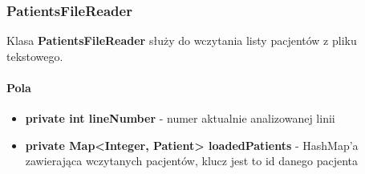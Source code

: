 \documentclass[]{article}
\begin{document}
            \subsubsection{PatientsFileReader}
                Klasa \textbf{PatientsFileReader} służy do wczytania listy pacjentów z pliku tekstowego.
                
                \paragraph{Pola}
                    \begin{itemize}
                        \item \textbf{private int lineNumber} - numer aktualnie analizowanej linii
                        \item \textbf{private Map<Integer, Patient> loadedPatients} - HashMap'a zawierająca wczytanych pacjentów, klucz jest to id danego pacjenta
                    \end{itemize}
                
\end{document}
